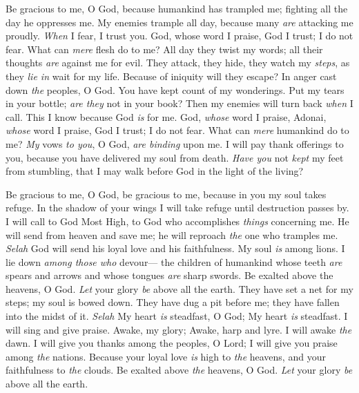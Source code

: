 \begin{biblechapter} %
 Be gracious to me, O God, because humankind has trampled me; 
fighting all the day he oppresses me.
\verse My enemies trample all day, 
because many \textit{are} attacking me proudly.
\verse \textit{When} I fear, I trust you.
\verse God, whose word I praise, 
God I trust; I do not fear. 
What can \textit{mere} flesh do to me?
\verse All day they twist my words; 
all their thoughts \textit{are} against me for evil.
\verse They attack, they hide, they watch my \textit{steps}, 
as they \textit{lie in} wait for my life.
\verse Because of iniquity will they escape? 
In anger cast down \textit{the} peoples, O God.
\verse You have kept count of my wonderings. 
Put my tears in your bottle; 
\textit{are they} not in your book?
\verse Then my enemies will turn back \textit{when} I call. 
This I know because God \textit{is} for me.
\verse God, \textit{whose} word I praise, 
Adonai, \textit{whose} word I praise,
\verse God I trust; I do not fear. 
What can \textit{mere} humankind do to me?
\verse \textit{My} vows \textit{to you}, O God, \textit{are binding} upon me. 
I will pay thank offerings to you,
\verse because you have delivered my soul from death. 
\textit{Have you} not \textit{kept} my feet from stumbling, 
that I may walk before God 
in the light of the living?
\end{biblechapter}

\begin{biblechapter} %
 Be gracious to me, O God, be gracious to me, 
because in you my soul takes refuge. 
In the shadow of your wings I will take refuge 
until destruction passes by.
\verse I will call to God Most High, 
to God who accomplishes \textit{things} concerning me.
\verse He will send from heaven and save me; 
he will reproach \textit{the} one who tramples me. \textit{Selah} 
God will send his loyal love and his faithfulness.
\verse My soul \textit{is} among lions. 
I lie down \textit{among those who} devour— 
the children of humankind whose teeth \textit{are} spears and arrows 
and whose tongues \textit{are} sharp swords.
\verse Be exalted above the heavens, O God. 
\textit{Let} your glory \textit{be} above all the earth.
\verse They have set a net for my steps; 
my soul is bowed down. 
They have dug a pit before me; 
they have fallen into the midst of it. \textit{Selah}
\verse My heart \textit{is} steadfast, O God; 
My heart \textit{is} steadfast. 
I will sing and give praise.
\verse Awake, my glory; 
Awake, harp and lyre. 
I will awake \textit{the} dawn.
\verse I will give you thanks among the peoples, O Lord; 
I will give you praise among \textit{the} nations.
\verse Because your loyal love \textit{is} high to \textit{the} heavens, 
and your faithfulness to \textit{the} clouds.
\verse Be exalted above \textit{the} heavens, O God. 
\textit{Let} your glory \textit{be} above all the earth.
\end{biblechapter}

